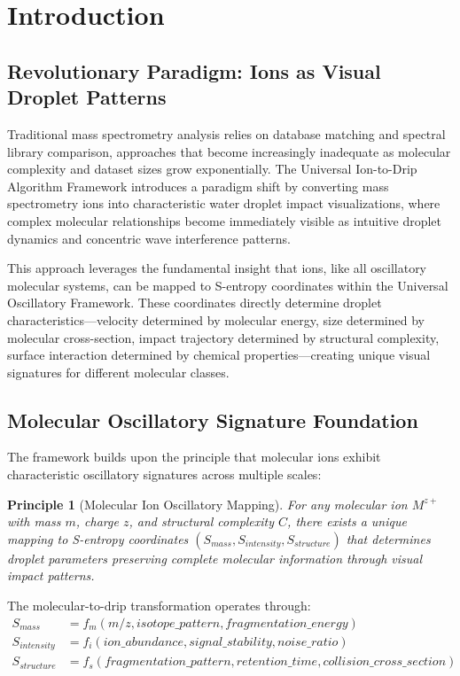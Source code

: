 \documentclass[12pt,a4paper]{article}
\newtheorem{principle}{Principle}
\begin{document}
\section{Introduction}

\subsection{Revolutionary Paradigm: Ions as Visual Droplet Patterns}

Traditional mass spectrometry analysis relies on database matching and spectral library comparison, approaches that become increasingly inadequate as molecular complexity and dataset sizes grow exponentially. The Universal Ion-to-Drip Algorithm Framework introduces a paradigm shift by converting mass spectrometry ions into characteristic water droplet impact visualizations, where complex molecular relationships become immediately visible as intuitive droplet dynamics and concentric wave interference patterns.

This approach leverages the fundamental insight that ions, like all oscillatory molecular systems, can be mapped to S-entropy coordinates within the Universal Oscillatory Framework. These coordinates directly determine droplet characteristics—velocity determined by molecular energy, size determined by molecular cross-section, impact trajectory determined by structural complexity, surface interaction determined by chemical properties—creating unique visual signatures for different molecular classes.

\subsection{Molecular Oscillatory Signature Foundation}

The framework builds upon the principle that molecular ions exhibit characteristic oscillatory signatures across multiple scales:

\begin{principle}[Molecular Ion Oscillatory Mapping]
For any molecular ion $M^{z+}$ with mass $m$, charge $z$, and structural complexity $C$, there exists a unique mapping to S-entropy coordinates $(S_{mass}, S_{intensity}, S_{structure})$ that determines droplet parameters preserving complete molecular information through visual impact patterns.
\end{principle}

The molecular-to-drip transformation operates through:
\begin{align}
S_{mass} &= f_m(m/z, isotope\_pattern, fragmentation\_energy) \\
S_{intensity} &= f_i(ion\_abundance, signal\_stability, noise\_ratio) \\
S_{structure} &= f_s(fragmentation\_pattern, retention\_time, collision\_cross\_section)
\end{align}
\end{document}
